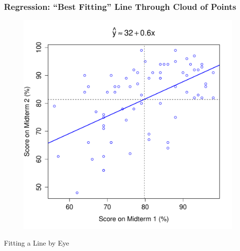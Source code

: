 \documentclass[handout]{beamer}
\begin{document}
\begin{frame}
\frametitle{Regression: ``Best Fitting'' Line Through Cloud of Points}
\begin{figure}
	\includegraphics[scale = 0.48]{./images/midterms5}
\end{figure}
\end{frame}

\begin{frame}

\centering \Huge Fitting a Line by Eye


\end{frame}


\begin{frame}



\end{frame}
\end{document}
